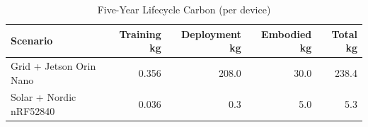 \begin{table}[htbp]
\centering
\caption{Five-Year Lifecycle Carbon (per device)}
\label{tab:carbon}
\begin{tabular}{lrrrr}
\hline
Scenario & Training kg & Deployment kg & Embodied kg & Total kg \\
\hline
Grid + Jetson Orin Nano & 0.356 & 208.0 & 30.0 & 238.4 \\
Solar + Nordic nRF52840 & 0.036 & 0.3 & 5.0 & 5.3 \\
\hline
\end{tabular}
\end{table}
